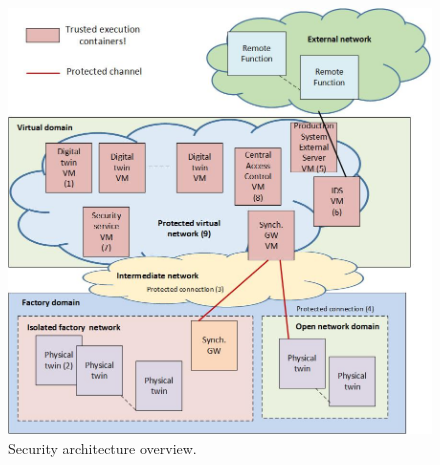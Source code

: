 \begin{figure}[th]
\hspace*{-0.2in}
   \centering
    \includegraphics[scale=0.35]{papers/digital-twin/images/FIG3_TII_191326}
    \caption{Security architecture overview.}
    \label{figure:security_architecture}
    
\end{figure}
\vspace*{-0.2in}
